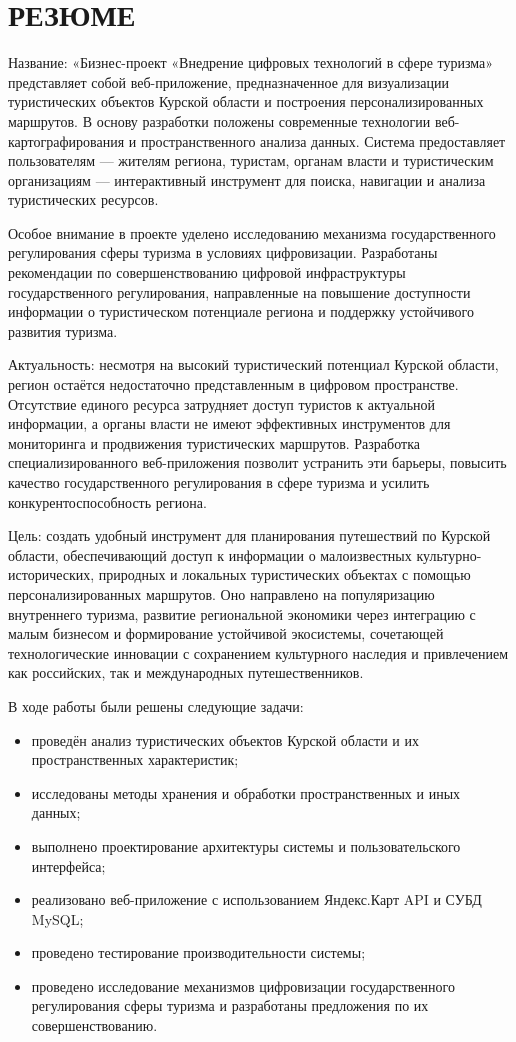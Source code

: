 \section*{РЕЗЮМЕ}

Название: «Бизнес-проект «Внедрение цифровых технологий в сфере туризма» представляет собой веб-приложение, предназначенное для визуализации туристических объектов Курской области и построения персонализированных маршрутов. В основу разработки положены современные технологии веб-картографирования и пространственного анализа данных. Система предоставляет пользователям — жителям региона, туристам, органам власти и туристическим организациям — интерактивный инструмент для поиска, навигации и анализа туристических ресурсов.

Особое внимание в проекте уделено исследованию механизма государственного регулирования сферы туризма в условиях цифровизации. Разработаны рекомендации по совершенствованию цифровой инфраструктуры государственного регулирования, направленные на повышение доступности информации о туристическом потенциале региона и поддержку устойчивого развития туризма.

Актуальность: несмотря на высокий туристический потенциал Курской области, регион остаётся недостаточно представленным в цифровом пространстве. Отсутствие единого ресурса затрудняет доступ туристов к актуальной информации, а органы власти не имеют эффективных инструментов для мониторинга и продвижения туристических маршрутов. Разработка специализированного веб-приложения позволит устранить эти барьеры, повысить качество государственного регулирования в сфере туризма и усилить конкурентоспособность региона.

Цель: создать удобный инструмент для планирования путешествий по Курской области, обеспечивающий доступ к информации о малоизвестных культурно-исторических, природных и локальных туристических объектах с помощью персонализированных маршрутов. Оно направлено на популяризацию внутреннего туризма, развитие региональной экономики через интеграцию с малым бизнесом и формирование устойчивой экосистемы, сочетающей технологические инновации с сохранением культурного наследия и привлечением как российских, так и международных путешественников.

В ходе работы были решены следующие задачи:
\begin{itemize}
	\item проведён анализ туристических объектов Курской области и их пространственных характеристик;
	\item исследованы методы хранения и обработки пространственных и иных данных;
	\item выполнено проектирование архитектуры системы и пользовательского интерфейса;
	\item реализовано веб-приложение с использованием Яндекс.Карт API и СУБД MySQL;
	\item проведено тестирование производительности системы;
	\item проведено исследование механизмов цифровизации государственного регулирования сферы туризма и разработаны предложения по их совершенствованию.
\end{itemize}

